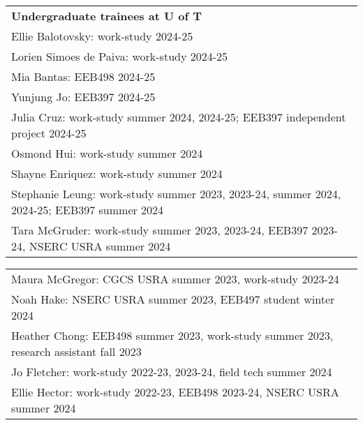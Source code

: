 \documentclass[letterpaper,11pt,oneside]{article}
\begin{document}
\def\arraystretch{1.1}
\noindent \begin{tabular}{@{} >{\raggedright\arraybackslash}p{17.0cm}}
\textbf{Undergraduate trainees at U of T} \\
Ellie Balotovsky: work-study 2024-25 \\
Lorien Simoes de Paiva: work-study 2024-25 \\
Mia Bantas: EEB498 2024-25 \\
Yunjung Jo: EEB397 2024-25 \\
Julia Cruz: work-study summer 2024, 2024-25; EEB397 independent project 2024-25 \\
Osmond Hui: work-study summer 2024 \\
Shayne Enriquez: work-study summer 2024 \\
Stephanie Leung: work-study summer 2023, 2023-24, summer 2024, 2024-25; EEB397 summer 2024  \\
Tara McGruder: work-study summer 2023, 2023-24, EEB397 2023-24, NSERC USRA summer 2024 \\
\end{tabular}

\def\arraystretch{1.1}
\noindent \begin{tabular}{@{} >{\raggedright\arraybackslash}p{17.0cm}}
Maura McGregor: CGCS USRA summer 2023, work-study 2023-24 \\
Noah Hake: NSERC USRA summer 2023, EEB497 student winter 2024 \\
Heather Chong: EEB498 summer 2023, work-study summer 2023, research assistant fall 2023  \\
Jo Fletcher: work-study 2022-23, 2023-24, field tech summer 2024 \\
Ellie Hector: work-study 2022-23, EEB498 2023-24, NSERC USRA summer 2024 \\
\end{tabular}

\medskip
\end{document}

